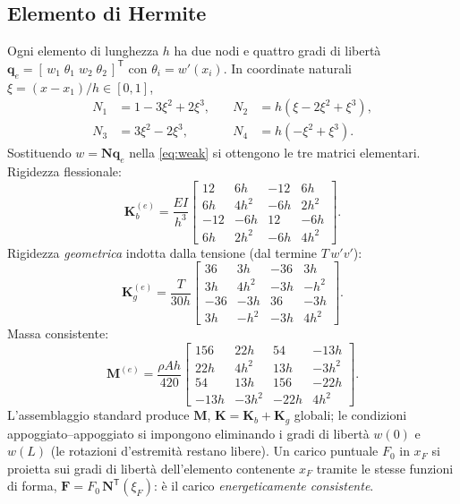 \documentclass[11pt,a4paper]{article}
\begin{document}
\subsection{Elemento di Hermite}
Ogni elemento di lunghezza $h$ ha due nodi e quattro gradi di libert\`a
$\bm{q}_e = [\,w_1\;\theta_1\;w_2\;\theta_2\,]^{\mathsf T}$ con
$\theta_i = w'(x_i)$. In coordinate naturali $\xi = (x-x_1)/h \in [0,1]$,
\begin{equation}
\begin{aligned}
N_1 &= 1 - 3\xi^2 + 2\xi^3, &\quad N_2 &= h(\xi - 2\xi^2 + \xi^3),\\
N_3 &= 3\xi^2 - 2\xi^3,     &\quad N_4 &= h(-\xi^2 + \xi^3).
\end{aligned}
\end{equation}
Sostituendo $w = \bm{N}\bm{q}_e$ nella \eqref{eq:weak} si ottengono le tre
matrici elementari. Rigidezza flessionale:
\begin{equation}
\bm{K}_b^{(e)} = \frac{EI}{h^3}
\begin{bmatrix}
12 & 6h & -12 & 6h\\
6h & 4h^2 & -6h & 2h^2\\
-12 & -6h & 12 & -6h\\
6h & 2h^2 & -6h & 4h^2
\end{bmatrix}.
\end{equation}
Rigidezza \emph{geometrica} indotta dalla tensione (dal termine $T\,w'v'$):
\begin{equation}
\bm{K}_g^{(e)} = \frac{T}{30h}
\begin{bmatrix}
36 & 3h & -36 & 3h\\
3h & 4h^2 & -3h & -h^2\\
-36 & -3h & 36 & -3h\\
3h & -h^2 & -3h & 4h^2
\end{bmatrix}.
\end{equation}
Massa consistente:
\begin{equation}
\bm{M}^{(e)} = \frac{\rho A h}{420}
\begin{bmatrix}
156 & 22h & 54 & -13h\\
22h & 4h^2 & 13h & -3h^2\\
54 & 13h & 156 & -22h\\
-13h & -3h^2 & -22h & 4h^2
\end{bmatrix}.
\end{equation}
L'assemblaggio standard produce $\bm{M}$, $\bm{K} = \bm{K}_b + \bm{K}_g$
globali; le condizioni appoggiato--appoggiato si impongono eliminando i gradi
di libert\`a $w(0)$ e $w(L)$ (le rotazioni d'estremit\`a restano libere). Un
carico puntuale $F_0$ in $x_F$ si proietta sui gradi di libert\`a
dell'elemento contenente $x_F$ tramite le stesse funzioni di forma,
$\bm{F} = F_0\,\bm{N}^{\mathsf T}(\xi_F)$: \`e il carico
\emph{energeticamente consistente}.
\end{document}
